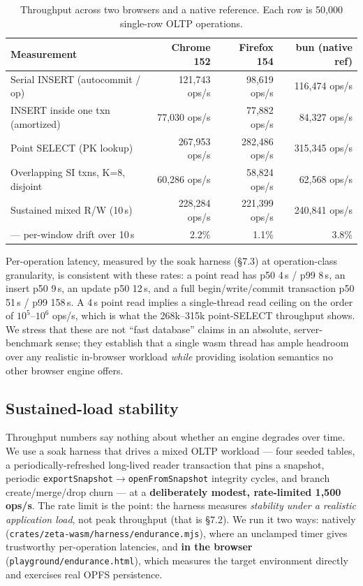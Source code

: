 \documentclass[11pt]{article}
\begin{document}
\begin{table}[htbp]
\centering
\caption{Throughput across two browsers and a native reference. Each row is 50,000
single-row OLTP operations.}
\label{tab:tput}
\begin{tabular}{lrrr}
\toprule
\textbf{Measurement} & \textbf{Chrome 152} & \textbf{Firefox 154} & \textbf{bun (native ref)} \\
\midrule
Serial INSERT (autocommit / op) & 121,743 ops/s & 98,619 ops/s & 116,474 ops/s \\
INSERT inside one txn (amortized) & 77,030 ops/s & 77,882 ops/s & 84,327 ops/s \\
Point SELECT (PK lookup) & 267,953 ops/s & 282,486 ops/s & 315,345 ops/s \\
Overlapping SI txns, K=8, disjoint & 60,286 ops/s & 58,824 ops/s & 62,568 ops/s \\
Sustained mixed R/W (10\,s) & 228,284 ops/s & 221,399 ops/s & 240,841 ops/s \\
\quad --- per-window drift over 10\,s & 2.2\% & 1.1\% & 3.8\% \\
\bottomrule
\end{tabular}
\end{table}

Per-operation latency, measured by the soak harness (\S7.3) at operation-class
granularity, is consistent with these rates: a point read has p50 4\,\textmu s / p99
8\,\textmu s, an insert p50 9\,\textmu s, an update p50 12\,\textmu s, and a full
begin/write/commit transaction p50 51\,\textmu s / p99 158\,\textmu s. A 4\,\textmu s
point read implies a single-thread read ceiling on the order of $10^5$--$10^6$
ops/s, which is what the 268k--315k point-SELECT throughput shows. We stress that
these are not ``fast database'' claims in an absolute, server-benchmark sense; they
establish that a single wasm thread has ample headroom over any realistic in-browser
workload \emph{while} providing isolation semantics no other browser engine offers.

\subsection{Sustained-load stability}

Throughput numbers say nothing about whether an engine degrades over time. We use a
soak harness that drives a mixed OLTP workload --- four seeded tables, a
periodically-refreshed long-lived reader transaction that pins a snapshot, periodic
\texttt{exportSnapshot}$\rightarrow$\texttt{openFromSnapshot} integrity cycles, and
branch create/merge/drop churn --- at a \textbf{deliberately modest, rate-limited
1,500 ops/s}. The rate limit is the point: the harness measures \emph{stability
under a realistic application load}, not peak throughput (that is \S7.2). We run it
two ways: natively (\texttt{crates/zeta-wasm/harness/endurance.mjs}), where an
unclamped timer gives trustworthy per-operation latencies, and \textbf{in the
browser} (\texttt{playground/endurance.html}), which measures the target environment
directly and exercises real OPFS persistence.
\end{document}
